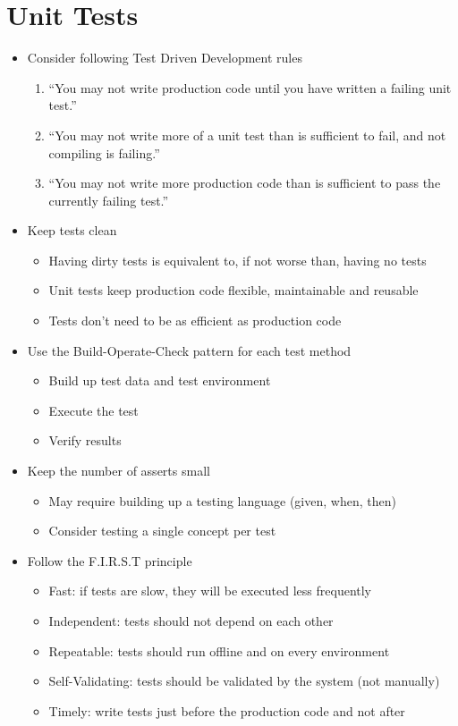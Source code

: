 \section{Unit Tests}
\begin{itemize}
    \item Consider following Test Driven Development rules
    \begin{enumerate}
        \item ``You may not write production code until you have written a failing unit test.''
        \item ``You may not write more of a unit test than is sufficient to fail, and not compiling is failing.''
        \item ``You may not write more production code than is sufficient to pass the currently failing test.''
    \end{enumerate}
    \item Keep tests clean
    \begin{itemize}
        \item Having dirty tests is equivalent to, if not worse than, having no tests
        \item Unit tests keep production code flexible, maintainable and reusable
        \item Tests don't need to be as efficient as production code
    \end{itemize}
    \item Use the Build-Operate-Check pattern for each test method
    \begin{itemize}
        \item Build up test data and test environment
        \item Execute the test
        \item Verify results
    \end{itemize}
    \item Keep the number of asserts small
    \begin{itemize}
        \item May require building up a testing language (given, when, then)
        \item Consider testing a single concept per test
    \end{itemize}
    \item Follow the F.I.R.S.T principle
    \begin{itemize}
        \item Fast: if tests are slow, they will be executed less frequently
        \item Independent: tests should not depend on each other
        \item Repeatable: tests should run offline and on every environment
        \item Self-Validating: tests should be validated by the system (not manually)
        \item Timely: write tests just before the production code and not after
    \end{itemize}
\end{itemize}
